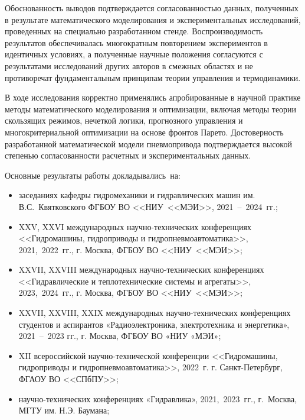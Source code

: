 Обоснованность выводов подтверждается согласованностью данных, полученных в результате математического
моделирования и экспериментальных исследований, проведенных на специально разработанном стенде.
Воспроизводимость результатов обеспечивалась многократным повторением экспериментов в идентичных условиях,
а полученные научные положения согласуются с результатами исследований других авторов в
смежных областях и не противоречат фундаментальным принципам теории управления и термодинамики.

В ходе исследования корректно применялись апробированные в научной практике методы математического
моделирования и оптимизации, включая методы теории скользящих режимов, нечеткой логики,
прогнозного управления и многокритериальной оптимизации на основе фронтов Парето. Достоверность
разработанной математической модели пневмопривода подтверждается высокой степенью
согласованности расчетных и экспериментальных данных.

{\probation}
Основные результаты работы докладывались~на:
\begin{itemize}
	\item заседаниях кафедры гидромеханики и гидравлических машин им.
	      В.С.~Квятковского ФГБОУ ВО <<НИУ~<<МЭИ>>, 2021~--~2024~гг.;

	\item XXV, XXVI международных научно-технических конференциях <<Гидромашины,
	      гидроприводы и гидропневмоавтоматика>>, 2021,~2022~гг., г. Москва, ФГБОУ ВО <<НИУ~<<МЭИ>>;

	\item XXVII, XXVIII международных научно-технических конференциях <<Гидравлические и теплотехнические
	      системы и агрегаты>>, 2023,~2024~гг., г. Москва, ФГБОУ ВО <<НИУ~<<МЭИ>>;

	\item XXVII, XXVIII, XXIX международных научно-технических конференциях студентов и
	      аспирантов «Радиоэлектроника, электротехника и энергетика», 2021~--~2023 гг., г. Москва, ФГБОУ ВО «НИУ «МЭИ»;

	\item XII всероссийской научно-технической конференции <<Гидромашины, гидроприводы и гидропневмоавтоматика>>,
	      2022~г. г. Санкт-Петербург, ФГАОУ ВО <<СПбПУ>>;

	\item научно-технических конференциях «Гидравлика», 2021,~2023~гг., г.~Москва, МГТУ
	      им. Н.Э. Баумана;

\end{itemize}

